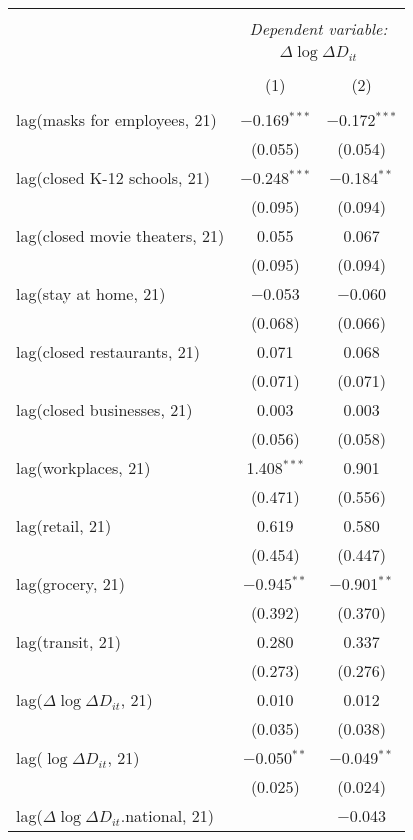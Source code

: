 \begin{tabular}{@{\extracolsep{1pt}}lcc} 
\\[-1.8ex]\hline 
\hline \\[-1.8ex] 
 & \multicolumn{2}{c}{\textit{Dependent variable:}} \\ 
\cline{2-3} 
 & \multicolumn{2}{c}{$\Delta \log \Delta D_{it}$} \\ 
\\[-1.8ex] & (1) & (2)\\ 
\hline \\[-1.8ex] 
 lag(masks for employees, 21) & $-$0.169$^{***}$ & $-$0.172$^{***}$ \\ 
  & (0.055) & (0.054) \\ 
  lag(closed K-12 schools, 21) & $-$0.248$^{***}$ & $-$0.184$^{**}$ \\ 
  & (0.095) & (0.094) \\ 
  lag(closed movie theaters, 21) & 0.055 & 0.067 \\ 
  & (0.095) & (0.094) \\ 
  lag(stay at home, 21) & $-$0.053 & $-$0.060 \\ 
  & (0.068) & (0.066) \\ 
  lag(closed restaurants, 21) & 0.071 & 0.068 \\ 
  & (0.071) & (0.071) \\ 
  lag(closed businesses, 21) & 0.003 & 0.003 \\ 
  & (0.056) & (0.058) \\ 
  lag(workplaces, 21) & 1.408$^{***}$ & 0.901 \\ 
  & (0.471) & (0.556) \\ 
  lag(retail, 21) & 0.619 & 0.580 \\ 
  & (0.454) & (0.447) \\ 
  lag(grocery, 21) & $-$0.945$^{**}$ & $-$0.901$^{**}$ \\ 
  & (0.392) & (0.370) \\ 
  lag(transit, 21) & 0.280 & 0.337 \\ 
  & (0.273) & (0.276) \\ 
  lag($\Delta \log \Delta D_{it}$, 21) & 0.010 & 0.012 \\ 
  & (0.035) & (0.038) \\ 
  lag($\log \Delta D_{it}$, 21) & $-$0.050$^{**}$ & $-$0.049$^{**}$ \\ 
  & (0.025) & (0.024) \\ 
  lag($\Delta \log \Delta D_{it}$.national, 21) &  & $-$0.043 \\ 

\end{tabular}
